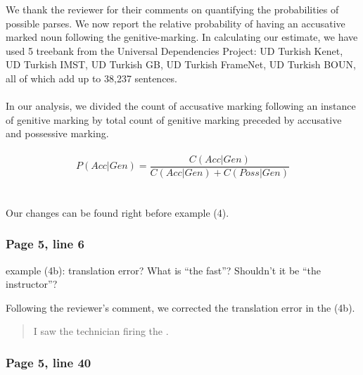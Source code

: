 \documentclass{ar2rc}
\begin{document}
\AC We thank the reviewer for their comments on quantifying the probabilities of possible parses. We now report the relative probability of having an accusative marked noun following the genitive-marking. In calculating our estimate, we have used 5 treebank from the Universal Dependencies Project: UD Turkish Kenet, UD Turkish IMST, UD Turkish GB, UD Turkish FrameNet, UD Turkish BOUN, all of which add up to 38,237 sentences.\\\\
In our analysis, we divided the count of accusative marking following an instance of genitive marking by total count of genitive marking preceded by accusative and possessive marking.\\\\
$$
P(Acc|Gen) = \frac{C(Acc|Gen)}{C(Acc|Gen)+C(Poss|Gen)}
$$\\\\
Our changes can be found right before example (4).

\begin{quote}
    \DIFaddbegin {} \DIFaddend
\end{quote}


\subsubsection{Page 5, line 6}

\RC example (4b): translation error? What is ``the fast''? Shouldn't it be ``the instructor''?

\AR Following the reviewer's comment, we corrected the translation error in the (4b).

\begin{quote}
    I saw the technician firing the \DIFaddbegin {} \DIFaddend \DIFdelbegin {} \DIFdelend. 
\end{quote}

\subsubsection{Page 5, line 40}
\end{document}
